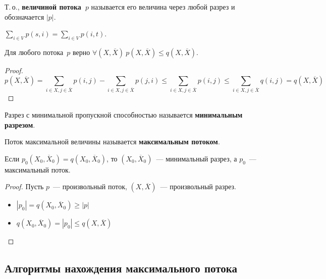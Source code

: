 Т.\,о., \textbf{величиной потока~$p$} называется его величина через любой разрез и обозначается $|p|$.

\begin{consequent}
$\sum\limits_{i \in V} p(s, i) = \sum\limits_{i \in V} p(i, t)$.
\end{consequent}

\begin{lemma}
Для любого потока~$p$ верно $\forall (X, \overline X) \ p(X, \overline X) \leqslant q(X, \overline X)$.
\end{lemma}
\begin{proof}
\begin{equation*}
p(X, \overline X) =
\sum_{i \in X, j \in \overline X} p(i, j) - \sum_{i \in X, j \in \overline X} p(j, i) \leqslant
\sum_{i \in X, j \in \overline X} p(i, j) \leqslant
\sum_{i \in X, j \in \overline X} q(i, j) =
q(X, \overline X)
\end{equation*}
\end{proof}

Разрез с минимальной пропускной способностью называется \textbf{минимальным разрезом}.

Поток максимальной величины называется \textbf{максимальным потоком}.

\begin{lemma}
Если $p_0(X_0, \overline X_0) = q(X_0, \overline X_0)$, то $(X_0, \overline X_0)$~--- минимальный разрез, а $p_0$~--- максимальный поток.
\end{lemma}
\begin{proof}
Пусть $p$~--- произвольный поток, $(X, \overline X)$~--- произвольный разрез.
\begin{itemize}
	\item $|p_0| = q(X_0, \overline X_0) \geqslant |p|$
	\item $q(X_0, \overline X_0) = |p_0| \leqslant q(X, \overline X)$
\end{itemize}
\end{proof}

\subsection{Алгоритмы нахождения максимального потока}
